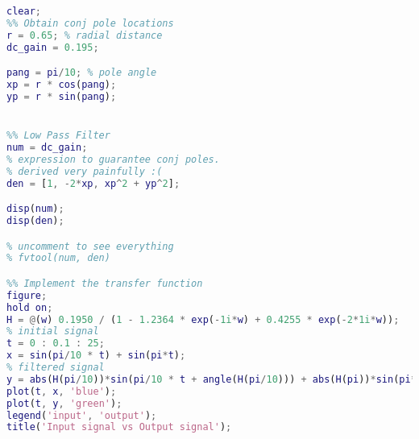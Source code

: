 \documentclass[]{report}
\begin{document}
\begin{lstlisting}[language=Matlab]
clear;
%% Obtain conj pole locations
r = 0.65; % radial distance
dc_gain = 0.195;

pang = pi/10; % pole angle
xp = r * cos(pang);
yp = r * sin(pang);


%% Low Pass Filter
num = dc_gain;
% expression to guarantee conj poles.
% derived very painfully :(
den = [1, -2*xp, xp^2 + yp^2]; 

disp(num);
disp(den);

% uncomment to see everything
% fvtool(num, den) 

%% Implement the transfer function
figure; 
hold on;
H = @(w) 0.1950 / (1 - 1.2364 * exp(-1i*w) + 0.4255 * exp(-2*1i*w));
% initial signal
t = 0 : 0.1 : 25;
x = sin(pi/10 * t) + sin(pi*t);
% filtered signal
y = abs(H(pi/10))*sin(pi/10 * t + angle(H(pi/10))) + abs(H(pi))*sin(pi*t + angle(H(pi)));
plot(t, x, 'blue');
plot(t, y, 'green');
legend('input', 'output');
title('Input signal vs Output signal');
\end{lstlisting}
\end{document}
